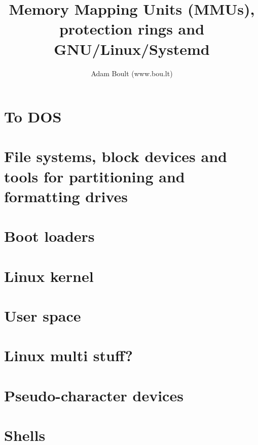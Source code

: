 \documentclass[oneside]{book}
\begin{document}
\author{Adam Boult (www.bou.lt)}
\title{Memory Mapping Units (MMUs), protection rings and GNU/Linux/Systemd}
\maketitle

\setcounter{tocdepth}{0}
\tableofcontents



\part{To DOS}



\part{File systems, block devices and tools for partitioning and formatting drives}






\part{Boot loaders}



\part{Linux kernel}




\part{User space}



\part{Linux multi stuff?}




\part{Pseudo-character devices}



\part{Shells}




\end{document}
